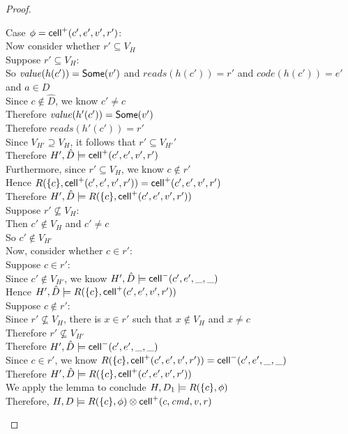 \begin{proof}
\begin{tabbedproof}
    \ooo Case $\phi = \mathsf{cell}^{+}({c'}, {e'}, {v'}, {r'})$: \\
    \oooo Now consider whether $r' \subseteq V_H$ \\
    \oooo Suppose $r' \subseteq V_{H}$: \\
    \ooooo So $\mathit{value}(h(c')) = \mathsf{Some}(v')$ and $\mathit{reads}(h(c')) = r'$ and
           $\mathit{code}(h(c')) = e'$ and $a \in D$ \\
    \ooooo Since $c \not \in \hat{D}$, we know $c' \not= c$ \\
    \ooooo Therefore $\mathit{value}(h'(c')) = \mathsf{Some}(v')$ \\
    \ooooo Therefore $\mathit{reads}(h'(c')) = r'$ \\
    \ooooo Since $V_{H'} \supseteq V_H$, it follows that $r' \subseteq V_{H'}'$ \\
    \ooooo Therefore $H', \hat{D} \models \mathsf{cell}^{+}({c'}, {e'}, {v'}, {r'})$ \\
    \ooooo Furthermore, since $r' \subseteq V_H$, we know $c \not\in r'$ \\
    \ooooo Hence $R(\{{c}\}, \mathsf{cell}^{+}({c'}, {e'}, {v'}, {r'})) = \mathsf{cell}^{+}({c'}, {e'}, {v'}, {r'})$ \\
    \ooooo Therefore $H', \hat{D} \models R(\{{c}\}, \mathsf{cell}^{+}({c'}, {e'}, {v'}, {r'}))$ \\
    \oooo Suppose $r' \not\subseteq V_{H}$: \\
    \ooooo Then $c' \not\in V_H$ and $c' \not= c$\\
    \ooooo So $c' \not \in V_{H'}$ \\
    \ooooo Now, consider whether $c \in r'$: \\
    \ooooo Suppose $c \in r'$: \\
    \oooooo Since $c' \not \in V_{H'}$, we know $H', \hat{D} \models \mathsf{cell}^{-}({c'}, {e'}, {\_}, {\_})$ \\
    \oooooo Hence $H', \hat{D} \models R(\{{c}\}, \mathsf{cell}^{+}({c'}, {e'}, {v'}, {r'}))$ \\
    \ooooo Suppose $c \not\in r'$: \\
    \oooooo Since $r' \not\subseteq V_H$, there is $x \in r'$ such that $x \not \in V_H$ and $x \not= c$ \\
    \oooooo Therefore $r' \not\subseteq V_{H'}$ \\
    \oooooo Therefore $H', \hat{D} \models \mathsf{cell}^{-}({c'}, {e'}, {\_}, {\_})$ \\
    \oooooo Since $c \in r'$, we know $R(\{{c}\}, \mathsf{cell}^{+}({c'}, {e'}, {v'}, {r'})) = \mathsf{cell}^{-}({c'}, {e'}, {\_}, {\_})$ \\
    \oooooo Therefore $H', \hat{D} \models R(\{{c}\}, \mathsf{cell}^{+}({c'}, {e'}, {v'}, {r'}))$ \\
    \oo We apply the lemma to conclude $H, D_1 \models R(\{{c}\}, \phi)$ \\
    \oo Therefore, $H, D \models R(\{{c}\}, \phi) \otimes \mathsf{cell}^{+}({c}, {\mathit{cmd}}, {v}, {r})$ \\
  \end{tabbedproof}
\end{proof}

